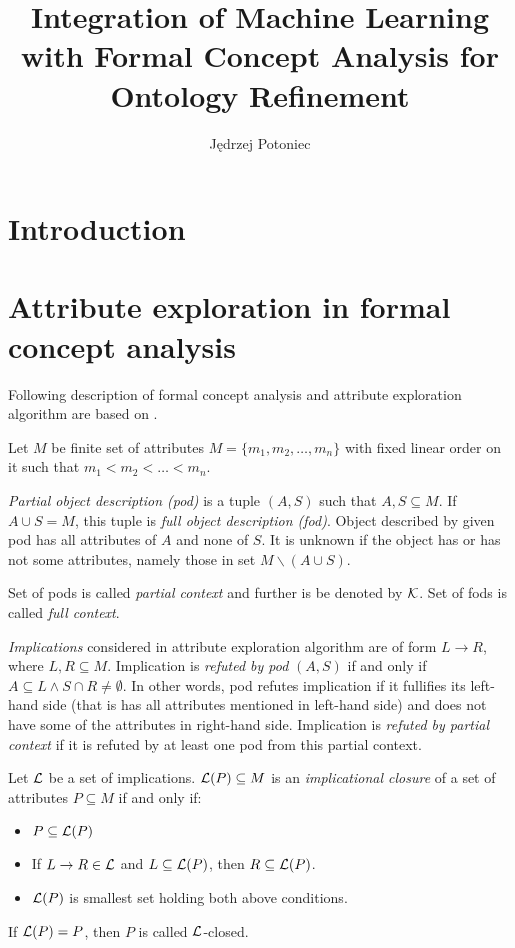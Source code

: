 \documentclass{llncs}
\title{Integration of Machine Learning with Formal Concept Analysis for Ontology Refinement}
\author{Jędrzej Potoniec}
\institute{Poznan University of Technology}
\newcommand{\pc}{\ensuremath\mathcal{K}}
\newcommand{\soi}{\ensuremath\mathcal{L}}
\begin{document}
\maketitle
\begin{abstract}
\end{abstract}

\section{Introduction}


\section{Attribute exploration in formal concept analysis}

Following description of formal concept analysis and attribute exploration algorithm are based on \cite{baader2007completing}.

Let $M$ be finite set of attributes 
$M=\{m_1,m_2,\ldots,m_n\}$ with fixed linear order on it such that
$m_1<m_2<\ldots<m_n$. 

\emph{Partial object description (pod)} is a tuple
$(A,S)$ such that $A,S\subseteq M$. If $A\cup
S=M$, this tuple is
\emph{full object description (fod)}. Object described by given pod
has all attributes of $A$ and none of $S$. It is unknown if the object has or
has not some attributes, namely those in set $M\backslash (A\cup S)$.

Set of pods is called \emph{partial context} and further is be denoted by $\pc$.
Set of fods is called \emph{full context}. 

\emph{Implications} considered in attribute exploration algorithm are of form
$L\rightarrow R$, where $L,R\subseteq M$. Implication is \emph{refuted by pod}
$(A,S)$ if and only if $A\subseteq L \land S\cap R\neq\emptyset$. In other words, pod
refutes implication if it fullifies its left-hand side (that is has all
attributes mentioned in left-hand side) and does not have some of the attributes in right-hand side.
Implication is \emph{refuted by partial context} if it is refuted by at least
one pod from this partial context.


\begin{definition}
Let $\soi$ be a set of implications. $\soi(P)\subseteq M$ is an \emph{implicational closure} of a set of attributes $P\subseteq M$ if and only if:
\begin{itemize}
\item $P\subseteq\soi(P)$
\item If $L\to R\in\soi$ and $L\subseteq \soi(P)$, then $R\subseteq\soi(P)$.
\item $\soi(P)$ is smallest set holding both above conditions.
\end{itemize}
If $\soi(P)=P$, then $P$ is called $\soi$-closed.
\end{definition}
\end{document}
